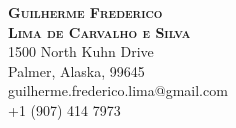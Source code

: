 \documentclass[11pt,a4paper]{article}
\begin{document}
\makeatletter
 \renewcommand{\@evenhead}{\textit{G. F. Lima de Carvalho e Silva CV continued...}\hfil}
 \renewcommand{\@oddhead}{\@evenhead}
 \renewcommand{\@evenfoot}{\hfil \thepage\ of\  \pageref{LastPage}\hfil}
 \renewcommand{\@oddfoot}{\@evenfoot}
\makeatother



\thispagestyle{empty}
\begin{center}
{\huge\textbf{\textsc{Guilherme Frederico \\[3mm] Lima de Carvalho e Silva}}} \\ \vspace{0.5cm}
{\color{darkgray}1500 North Kuhn Drive  \\ Palmer, Alaska, 99645 \\
  guilherme.frederico.lima@gmail.com \\ +1 (907) 414 7973}
\end{center}
\vspace{0.5cm}


\end{document}
